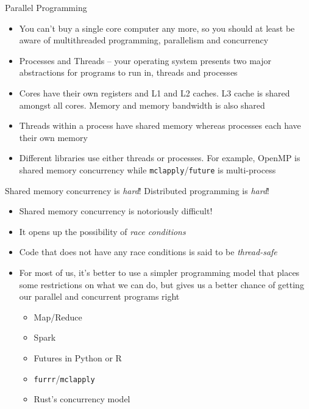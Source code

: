 \documentclass{beamer}
\begin{document}
\begin{frame}{Parallel Programming}
	\begin{itemize}
		\item You can't buy a single core computer any more, so you should at least be
		aware of multithreaded programming, parallelism and concurrency

		\item Processes and Threads -- your operating system presents two major
		abstractions for programs to run in, threads and processes
		
		\item Cores have their own registers and L1 and L2 caches. L3 cache is
		shared amongst all cores. Memory and memory bandwidth is also shared
		
		\item Threads within a process have shared memory whereas processes each
		have their own memory
		
		\item Different libraries use either threads or processes. For example,
		OpenMP is shared memory concurrency while
		\texttt{mclapply}/\texttt{future} is multi-process
	\end{itemize}		
\end{frame}

\begin{frame}{Shared memory concurrency is \emph{hard}! Distributed programming is \emph{hard}!}
	\begin{itemize}
		\item Shared memory concurrency is notoriously difficult!
		\item It opens up the possibility of \emph{race conditions}
		\item Code that does not have any race conditions is said to be \emph{thread-safe}
		\item For most of us, it's better to use a simpler programming model that
		places some restrictions on what we can do, but gives us a better chance
		of getting our parallel and concurrent programs right
		\begin{itemize}
			\item Map/Reduce
			\item Spark
			\item Futures in Python or R
			\item \texttt{furrr}/\texttt{mclapply}
			\item Rust's concurrency model
		\end{itemize} 
	\end{itemize}
\end{frame}	
\end{document}
